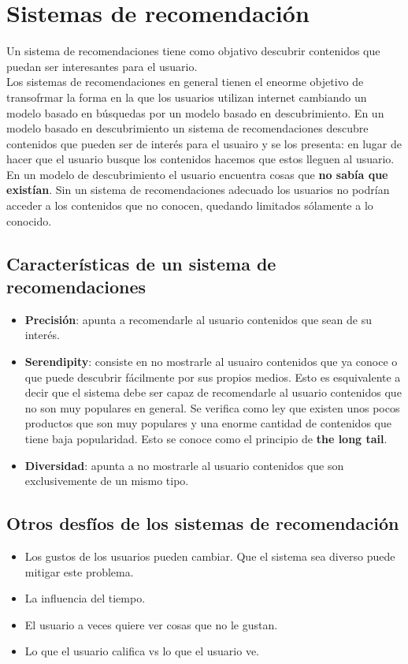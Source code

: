 \documentclass[titlepage,a4paper]{article}
\begin{document}
\section*{Sistemas de recomendación}
Un sistema de recomendaciones tiene como objativo descubrir contenidos que puedan ser interesantes para el usuario. \\ 

Los sistemas de recomendaciones en general  tienen el eneorme objetivo de transofrmar la forma en la que los usuarios utilizan internet cambiando un modelo basado en búsquedas por un modelo basado en descubrimiento. En un modelo basado en descubrimiento un sistema de recomendaciones descubre contenidos que pueden ser de interés para el usuairo y se los presenta: en lugar de hacer que el usuario busque los contenidos hacemos que estos lleguen al usuario. \\

En un modelo de descubrimiento el usuario encuentra cosas que \textbf{no sabía que existían}. Sin un sistema de recomendaciones adecuado los usuarios no podrían acceder a los contenidos que no conocen, quedando limitados sólamente a lo conocido. 

\subsection*{Características de un sistema de recomendaciones}
\begin{itemize}
\item \textbf{Precisión}: apunta a recomendarle al usuario contenidos que sean de su interés. 
\item \textbf{Serendipity}: consiste en no mostrarle al usuairo contenidos que ya conoce o que puede descubrir fácilmente por sus propios medios. Esto es esquivalente a decir que el sistema debe ser capaz de recomendarle al usuario contenidos que no son muy populares en general. Se verifica como ley que existen unos pocos productos que son muy populares y una enorme cantidad de contenidos que tiene baja popularidad. Esto se conoce como el principio de \textbf{the long tail}.
\item \textbf{Diversidad}: apunta a no mostrarle al usuario contenidos que son exclusivemente de un mismo tipo. 
\end{itemize}

\subsection*{Otros desfíos de los sistemas de recomendación}
\begin{itemize}
\item Los gustos de los usuarios pueden cambiar. Que el sistema sea diverso puede mitigar este problema. 
\item La influencia del tiempo. 
\item El usuario a veces quiere ver cosas que no le gustan. 
\item Lo que el usuario califica vs lo que el usuario ve. 
\end{itemize}
\end{document}
